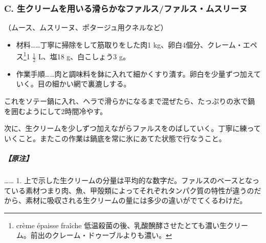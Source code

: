 \begin{recette}
\hypertarget{farce-c}{%
\subsubsection{C.
生クリームを用いる滑らかなファルス/ファルス・ムスリーヌ}\label{farce-c}}



（ムース、ムスリーヌ、ポタージュ用クネルなど）

\begin{itemize}
\item
  材料\ldots{}\ldots{}丁寧に掃除をして筋取りをした肉1
  kg、卵白4個分、クレーム・エペス\footnote{crème épaisse fraîche
    低温殺菌の後、乳酸醗酵させたとても濃い生クリーム。前出のクレーム・ドゥーブルよりも濃い。}1
  \(\frac{1}{2}\) L、塩18 g、白こしょう3 g。
\item
  作業手順\ldots{}\ldots{}肉と調味料を鉢に入れて細かくすり潰す。卵白を少量ずつ加えていく。目の細かい網で裏漉しする。
\end{itemize}

これをソテー鍋に入れ、ヘラで滑らかになるまで混ぜたら、たっぷりの氷で鍋を囲むようにして2時間冷やす。

次に、生クリームを少しずつ加えながらファルスをのばしていく。丁寧に練っていくこと。またこの作業は鍋底を常に氷にあてた状態で行なうこと。

\hypertarget{nota-farce-c}{%
\subparagraph{【原注】}\label{nota-farce-c}}

\ldots{}\ldots{} 1.
上で示した生クリームの分量は平均的な数字だ。ファルスのベースとなっている素材つまり肉、魚、甲殻類によってそれぞれタンパク質の特性が違うのだから、素材に吸収される生クリームの量には多少の違いがでてくるわけだ。


\end{recette}
